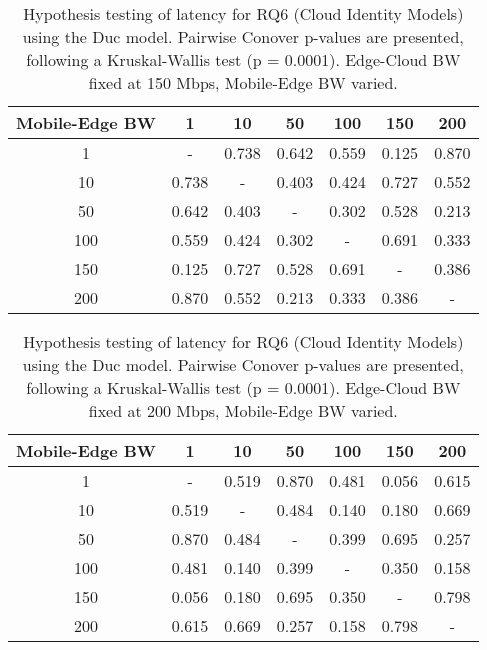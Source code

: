 \begin{table}[H]
\caption{Hypothesis testing of latency for RQ6 (Cloud Identity Models) using the Duc model. Pairwise Conover p-values are presented, following a Kruskal-Wallis test (p = 0.0001). Edge-Cloud BW fixed at 150 Mbps, Mobile-Edge BW varied.}
\centering
\begin{tabular}{c|cccccc}
Mobile-Edge BW & 1 & 10 & 50 & 100 & 150 & 200 \\
\hline
1 & - & 0.738 & 0.642 & 0.559 & 0.125 & 0.870 \\
10 & 0.738 & - & 0.403 & 0.424 & 0.727 & 0.552 \\
50 & 0.642 & 0.403 & - & 0.302 & 0.528 & 0.213 \\
100 & 0.559 & 0.424 & 0.302 & - & 0.691 & 0.333 \\
150 & 0.125 & 0.727 & 0.528 & 0.691 & - & 0.386 \\
200 & 0.870 & 0.552 & 0.213 & 0.333 & 0.386 & - \\
\end{tabular}
\end{table}

\begin{table}[H]
\caption{Hypothesis testing of latency for RQ6 (Cloud Identity Models) using the Duc model. Pairwise Conover p-values are presented, following a Kruskal-Wallis test (p = 0.0001). Edge-Cloud BW fixed at 200 Mbps, Mobile-Edge BW varied.}
\centering
\begin{tabular}{c|cccccc}
Mobile-Edge BW & 1 & 10 & 50 & 100 & 150 & 200 \\
\hline
1 & - & 0.519 & 0.870 & 0.481 & 0.056 & 0.615 \\
10 & 0.519 & - & 0.484 & 0.140 & 0.180 & 0.669 \\
50 & 0.870 & 0.484 & - & 0.399 & 0.695 & 0.257 \\
100 & 0.481 & 0.140 & 0.399 & - & 0.350 & 0.158 \\
150 & 0.056 & 0.180 & 0.695 & 0.350 & - & 0.798 \\
200 & 0.615 & 0.669 & 0.257 & 0.158 & 0.798 & - \\
\end{tabular}
\end{table}

